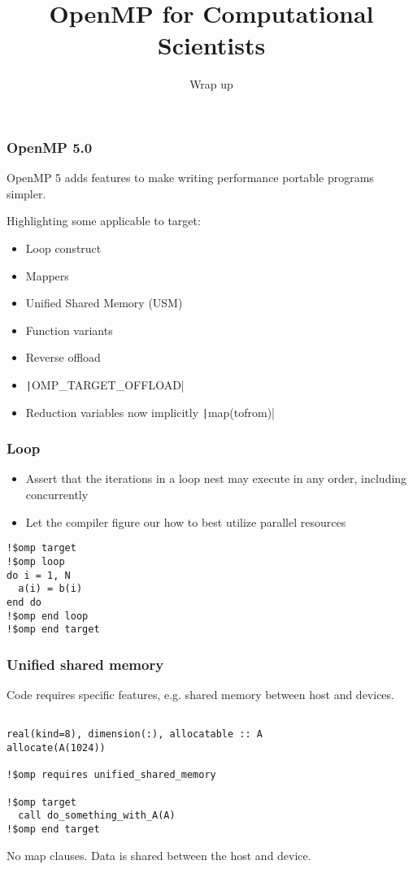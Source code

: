 \documentclass[aspectratio=169]{beamer}
\title{OpenMP for Computational Scientists}
\subtitle{Wrap up}
\begin{document}
\frame{\titlepage}


\begin{frame}
\frametitle{OpenMP 5.0}
OpenMP 5 adds features to make writing performance portable programs simpler.

Highlighting some applicable to target:
\begin{itemize}
\item Loop construct
\item Mappers
\item Unified Shared Memory (USM)
\item Function variants
\item Reverse offload
\item \texttt|OMP_TARGET_OFFLOAD|
\item Reduction variables now implicitly \texttt|map(tofrom)|
\end{itemize}

\end{frame}

\begin{frame}[fragile]
\frametitle{Loop}
\begin{itemize}
\item Assert that the iterations in a loop nest may execute in any order, including concurrently
\item Let the compiler figure our how to best utilize parallel resources
\end{itemize}

\begin{verbatim}
!$omp target
!$omp loop
do i = 1, N
  a(i) = b(i)
end do
!$omp end loop
!$omp end target
\end{verbatim}

\end{frame}

\begin{frame}[fragile]
\frametitle{Unified shared memory}
Code requires specific features, e.g. shared memory between host and devices.

\begin{verbatim}

real(kind=8), dimension(:), allocatable :: A
allocate(A(1024))

!$omp requires unified_shared_memory

!$omp target
  call do_something_with_A(A)
!$omp end target
\end{verbatim}

No map clauses. Data is shared between the host and device.

\end{frame}
\end{document}
